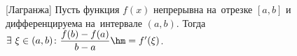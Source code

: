 [Лагранжа]\label{Lag}
    Пусть функция $f(x)$ непрерывна на~отрезке $[a,b]$ и дифференцируема на~интервале $(a,b)$. Тогда $\exists\  \xi\in(a,b)\colon \dfrac{f(b)-f(a)}{b-a}\hm=f'(\xi)$.
